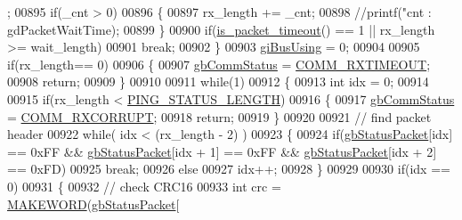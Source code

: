 \begin{DoxyCode}
      ;
00895                 \textcolor{keywordflow}{if}(\_cnt > 0)
00896                 \{
00897                     rx\_length += \_cnt;
00898                     \textcolor{comment}{//printf("cnt : %
       gdPacketWaitTime);}
00899                 \}
00900                 \textcolor{keywordflow}{if}(\hyperlink{classdynamixel2_a4c996c0d9edcfd320906674512837a9e}{is\_packet\_timeout}() == 1 || rx\_length >= wait\_length)
00901                     \textcolor{keywordflow}{break};
00902             \}
00903             \hyperlink{classdynamixel2_a7fc43b4c4b7e36aa8f0420b037658f83}{giBusUsing} = 0;
00904 
00905             \textcolor{keywordflow}{if}(rx\_length== 0)
00906             \{
00907                 \hyperlink{classdynamixel2_a703e327ba8ec5909c238dc94a00cb32d}{gbCommStatus} = \hyperlink{dynamixel_8h_af9976398353d104bb8a78b1f02f9fceb}{COMM\_RXTIMEOUT};
00908                 \textcolor{keywordflow}{return};
00909             \}
00910 
00911             \textcolor{keywordflow}{while}(1)
00912             \{
00913                 \textcolor{keywordtype}{int} idx = 0;
00914 
00915                 \textcolor{keywordflow}{if}(rx\_length < \hyperlink{dynamixel_8cpp_aedac6609b233fa877f86b3804204a2fe}{PING\_STATUS\_LENGTH})
00916                 \{
00917                     \hyperlink{classdynamixel2_a703e327ba8ec5909c238dc94a00cb32d}{gbCommStatus} = \hyperlink{dynamixel_8h_a93c30bd345d8077112f0a3524d26278b}{COMM\_RXCORRUPT};
00918                     \textcolor{keywordflow}{return};
00919                 \}
00920 
00921                 \textcolor{comment}{// find packet header}
00922                 \textcolor{keywordflow}{while}( idx < (rx\_length - 2) )
00923                 \{
00924                     \textcolor{keywordflow}{if}(\hyperlink{classdynamixel2_a0776f210a190cf57d1a6faf9697a593d}{gbStatusPacket}[idx] == 0xFF && 
      \hyperlink{classdynamixel2_a0776f210a190cf57d1a6faf9697a593d}{gbStatusPacket}[idx + 1] == 0xFF && \hyperlink{classdynamixel2_a0776f210a190cf57d1a6faf9697a593d}{gbStatusPacket}[idx + 2] == 0xFD)
00925                         \textcolor{keywordflow}{break};
00926                     \textcolor{keywordflow}{else}
00927                         idx++;
00928                 \}
00929 
00930                 \textcolor{keywordflow}{if}(idx == 0)
00931                 \{
00932                     \textcolor{comment}{// check CRC16}
00933                     \textcolor{keywordtype}{int} crc = \hyperlink{dynamixel_8h_a6b98c16b8e3e7733dd4063d0b0fac24c}{MAKEWORD}(\hyperlink{classdynamixel2_a0776f210a190cf57d1a6faf9697a593d}{gbStatusPacket}[

\end{DoxyCode}
